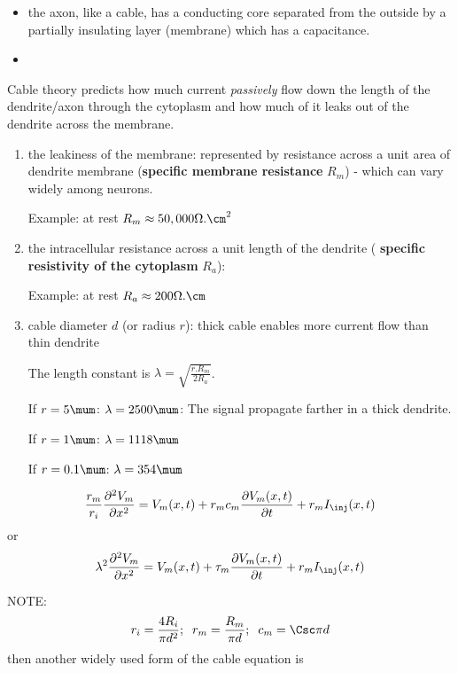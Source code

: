 \begin{itemize}
  \item the axon, like a cable, has a conducting core separated from the outside
  by a partially insulating layer (membrane) which has a capacitance.
  
  \item 
\end{itemize}
Cable theory predicts how much current {\it passively} flow down the length of
the dendrite/axon through the cytoplasm and how much of it leaks out of the
dendrite across the membrane.
\begin{enumerate}
  
  \item the leakiness of the membrane: represented by resistance across a unit
  area of dendrite membrane ({\bf specific membrane resistance} $R_m$) - which
  can vary widely among neurons.
  
Example: at rest $R_m \approx 50,000 \Omega.\cm^2$  
  
  \item the intracellular resistance across a unit length of the dendrite ({\bf
  specific resistivity of the cytoplasm} $R_a$):

Example: at rest $R_a \approx 200 \Omega.\cm$  
  
  \item cable diameter $d$ (or radius $r$): thick cable enables more current
  flow than thin dendrite
  
The length constant is $\lambda = \sqrt{\frac{r.R_m}{2 R_a}}$.

If $r=5 \mum$: $\lambda = 2500 \mum$: The signal propagate farther in a thick
dendrite.

If $r=1 \mum$: $\lambda = 1118 \mum$

If $r=0.1 \mum$: $\lambda = 354 \mum$

\end{enumerate}


\begin{equation}
  \frac{r_m}{r_i} \frac{\partial ^2V_m}{\partial x^2} = V_m(x,t) +
  r_m c_m \frac{\partial V_m (x,t)}{\partial t} + r_m I_\inj(x,t)
\end{equation}
or
\begin{equation}
  \lambda^2 \frac{\partial ^2V_m}{\partial x^2} = V_m(x,t) +
  \tau_m \frac{\partial V_m (x,t)}{\partial t} + r_m I_\inj(x,t)
\end{equation}

NOTE:
\begin{equation}
r_i = \frac{4R_i}{\pi d^2}; \;\; r_m = \frac{R_m}{\pi d}; \;\;
c_m = \Csc \pi d
\end{equation}
then another widely used form of the cable equation is

